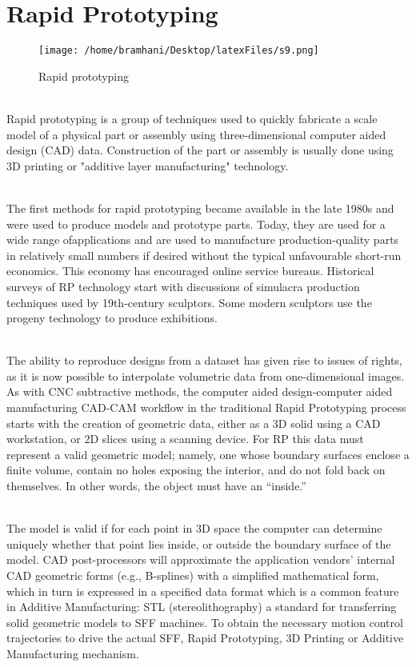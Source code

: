 \documentclass[12pt,a4paper]{report}
\begin{document}
	\section{Rapid Prototyping}
	\begin{figure}[H]
		\centering
		\texttt{[image: /home/bramhani/Desktop/latexFiles/s9.png]}
		\label{fig:Rapid prototyping}
		\caption{Rapid prototyping}
	\end{figure}
	\indent
	\\Rapid prototyping is a group of techniques used to quickly fabricate a scale model of a
	physical part or assembly using three-dimensional computer aided design (CAD) data. Construction
	of the part or assembly is usually done using 3D printing or "additive layer manufacturing"
	technology.\par
	\indent
	\\The first methods for rapid prototyping became available in the late 1980s and were used to
	produce models and prototype parts. Today, they are used for a wide range ofapplications and are
	used to manufacture production-quality parts in relatively small numbers if desired without the
	typical unfavourable short-run economics. This economy has encouraged online service bureaus.
	Historical surveys of RP technology start with discussions of simulacra production techniques used
	by 19th-century sculptors. Some modern sculptors use the progeny technology to produce
	exhibitions.\par
	\indent
	\\The ability to reproduce designs from a dataset has given rise to issues of rights, as it is now
	possible to interpolate volumetric data from one-dimensional images. As with CNC subtractive
	methods, the computer aided design-computer aided manufacturing CAD-CAM workflow in the
	traditional Rapid Prototyping process starts with the creation of geometric data, either as a 3D solid
	using a CAD workstation, or 2D slices using a scanning device. For RP this data must represent a
	valid geometric model; namely, one whose boundary surfaces enclose a finite volume, contain no
	holes exposing the interior, and do not fold back on themselves. In other words, the object must
	have an “inside.”\par
	
	\indent
	\\The model is valid if for each point in 3D space the computer can determine uniquely whether
	that point lies inside, or outside the boundary surface of the model. CAD post-processors will
	approximate the application vendors’ internal CAD geometric forms (e.g., B-splines) with a
	simplified mathematical form, which in turn is expressed in a specified data format which is a
	common feature in Additive Manufacturing: STL (stereolithography) a standard for transferring
	solid geometric models to SFF machines. To obtain the necessary motion control trajectories to
	drive the actual SFF, Rapid Prototyping, 3D Printing or Additive Manufacturing mechanism.\par
\end{document}
